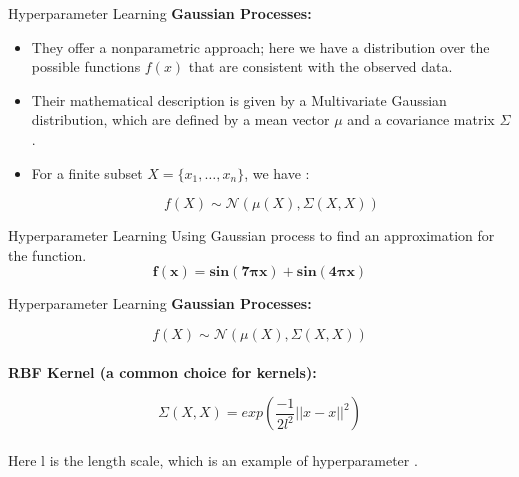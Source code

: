 \documentclass[t, aspectratio=169]{beamer}
\begin{document}
 \begin{frame}{Hyperparameter Learning}
 \vspace{0.7cm}
 \textbf{Gaussian Processes:}
 \vspace{0.7cm}
 \begin{itemize}
  \item They offer a nonparametric approach; here we have a distribution over the possible functions \(f(x)\) that are consistent with the observed data. 
  
\item Their mathematical description is given by a Multivariate Gaussian distribution, which are defined by a mean vector \(\mu\) and a covariance matrix \(\Sigma\).

\item For a finite subset \(X = \{ x_1,… , x_n \}\), we have \cite{Lofti}:

\[f(X) \sim  \mathcal{N}(\mu(X), \Sigma(X,X))\]

\end{itemize}

 \end{frame}   
 
 



\begin{frame}{Hyperparameter Learning}
\vspace{0.5cm}
Using Gaussian process to find an approximation for the function.
\[\mathbf{f(x) = sin(7\pi x) + sin(4 \pi x)}\]
\vspace{0.3cm}
\centering
\end{frame}


 \begin{frame}{Hyperparameter Learning}
 \vspace{0.7cm}
 \textbf{Gaussian Processes:}
 \vspace{0.7cm}


\[f(X) \sim  \mathcal{N}(\mu(X), \Sigma(X,X))\]\\
 \vspace{0.7cm}
\textbf{RBF Kernel (a common choice for kernels):}

\[\Sigma(X,X) = exp\left( \frac{-1}{2l^2}||{x-x}||^2 \right)\]\\
 \vspace{0.7cm}
Here l is the length scale, which is an example of hyperparameter \cite{Lofti}.

 \end{frame}   
\end{document}
